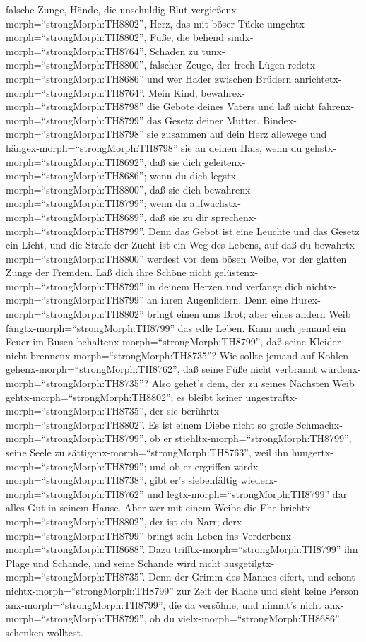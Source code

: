 falsche Zunge, Hände, die unschuldig Blut
vergießenx-morph=``strongMorph:TH8802'',  Herz, das mit
böser Tücke umgehtx-morph=``strongMorph:TH8802'', Füße, die behend
sindx-morph=``strongMorph:TH8764'', Schaden zu
tunx-morph=``strongMorph:TH8800'',  falscher Zeuge, der
frech Lügen redetx-morph=``strongMorph:TH8686'' und wer Hader zwischen
Brüdern anrichtetx-morph=``strongMorph:TH8764''.  Mein
Kind, bewahrex-morph=``strongMorph:TH8798'' die Gebote deines Vaters und
laß nicht fahrenx-morph=``strongMorph:TH8799'' das Gesetz deiner Mutter.
 Bindex-morph=``strongMorph:TH8798'' sie zusammen auf dein
Herz allewege und hängex-morph=``strongMorph:TH8798'' sie an deinen
Hals,  wenn du gehstx-morph=``strongMorph:TH8692'', daß sie
dich geleitenx-morph=``strongMorph:TH8686''; wenn du dich
legstx-morph=``strongMorph:TH8800'', daß sie dich
bewahrenx-morph=``strongMorph:TH8799''; wenn du
aufwachstx-morph=``strongMorph:TH8689'', daß sie zu dir
sprechenx-morph=``strongMorph:TH8799''.  Denn das Gebot ist
eine Leuchte und das Gesetz ein Licht, und die Strafe der Zucht ist ein
Weg des Lebens,  auf daß du
bewahrtx-morph=``strongMorph:TH8800'' werdest vor dem bösen Weibe, vor
der glatten Zunge der Fremden.  Laß dich ihre Schöne nicht
gelüstenx-morph=``strongMorph:TH8799'' in deinem Herzen und verfange
dich nichtx-morph=``strongMorph:TH8799'' an ihren Augenlidern.
 Denn eine Hurex-morph=``strongMorph:TH8802'' bringt einen
ums Brot; aber eines andern Weib fängtx-morph=``strongMorph:TH8799'' das
edle Leben.  Kann auch jemand ein Feuer im Busen
behaltenx-morph=``strongMorph:TH8799'', daß seine Kleider nicht
brennenx-morph=``strongMorph:TH8735''?  Wie sollte jemand
auf Kohlen gehenx-morph=``strongMorph:TH8762'', daß seine Füße nicht
verbrannt würdenx-morph=``strongMorph:TH8735''?  Also
gehet's dem, der zu seines Nächsten Weib
gehtx-morph=``strongMorph:TH8802''; es bleibt keiner
ungestraftx-morph=``strongMorph:TH8735'', der sie
berührtx-morph=``strongMorph:TH8802''.  Es ist einem Diebe
nicht so große Schmachx-morph=``strongMorph:TH8799'', ob er
stiehltx-morph=``strongMorph:TH8799'', seine Seele zu
sättigenx-morph=``strongMorph:TH8763'', weil ihn
hungertx-morph=``strongMorph:TH8799'';  und ob er ergriffen
wirdx-morph=``strongMorph:TH8738'', gibt er's siebenfältig
wiederx-morph=``strongMorph:TH8762'' und
legtx-morph=``strongMorph:TH8799'' dar alles Gut in seinem Hause.
 Aber wer mit einem Weibe die Ehe
brichtx-morph=``strongMorph:TH8802'', der ist ein Narr;
derx-morph=``strongMorph:TH8799'' bringt sein Leben ins
Verderbenx-morph=``strongMorph:TH8688''.  Dazu
trifftx-morph=``strongMorph:TH8799'' ihn Plage und Schande, und seine
Schande wird nicht ausgetilgtx-morph=``strongMorph:TH8735''.
 Denn der Grimm des Mannes eifert, und schont
nichtx-morph=``strongMorph:TH8799'' zur Zeit der Rache  und
sieht keine Person anx-morph=``strongMorph:TH8799'', die da versöhne,
und nimmt's nicht anx-morph=``strongMorph:TH8799'', ob du
vielx-morph=``strongMorph:TH8686'' schenken wolltest.

